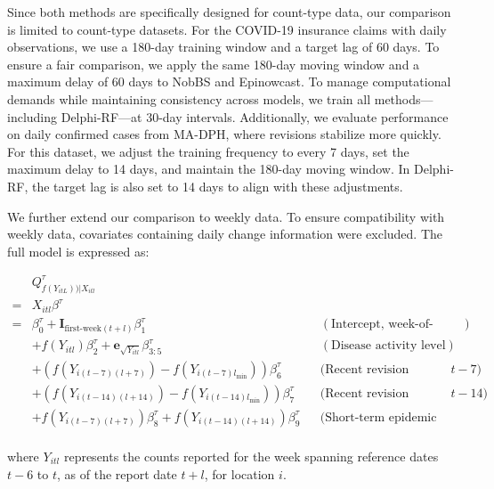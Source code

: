 Since both methods are specifically designed for count-type data, our comparison is limited to count-type datasets. For the COVID-19 insurance claims with daily observations, we use a 180-day training window and a target lag of 60 days. To ensure a fair comparison, we apply the same 180-day moving window and a maximum delay of 60 days to NobBS and Epinowcast. To manage computational demands while maintaining consistency across models, we train all methods—including Delphi-RF—at 30-day intervals. Additionally, we evaluate performance on daily confirmed cases from MA-DPH, where revisions stabilize more quickly. For this dataset, we adjust the training frequency to every 7 days, set the maximum delay to 14 days, and maintain the 180-day moving window. In Delphi-RF, the target lag is also set to 14 days to align with these adjustments.

We further extend our comparison to weekly data. To ensure compatibility with weekly data, covariates containing daily change information were excluded. The full model is expressed as:

\begin{align*} 
&Q_{f(Y_{itL}))|X_{itl}}^{\tau} \\
=  &X_{itl}\beta^{\tau}\\
 = &\beta_0^{\tau}  + \mathbf{I}_{\text{first-week}(t+l)}\beta_{1}^{\tau} &&(\text{Intercept, week-of-month effects})\\ 
& + f(Y_{itl})\beta_{2}^{\tau} + \mathbf{e}_{\sqrt{Y_{itl}}}\beta_{3:5}^{\tau} &&(\text{Disease activity level}) \\ 
&+ \left(f(Y_{i(t-7)(l+7)}) - f(Y_{i(t-7)l_{\text{min}}})\right) \beta_{6}^{\tau}
&& \text{(Recent revision magnitude, \(t{-}7\))} \\
&+ \left(f(Y_{i(t-14)(l+14)}) - f(Y_{i(t-14)l_{\text{min}}})\right) \beta_{7}^{\tau}
&& \text{(Recent revision magnitude, \(t{-}14\))} \\
& + f(Y_{i(t-7)(l+7)}) \beta_{8}^{\tau} + f(Y_{i(t-14)(l+14)}) \beta_{9}^{\tau}
&& \text{(Short-term epidemic trends)}\\
\end{align*}

where \(Y_{itl}\) represents the counts reported for the week spanning reference dates \(t-6\) to \(t\), as of the report date \(t+l\), for location \(i\). 

